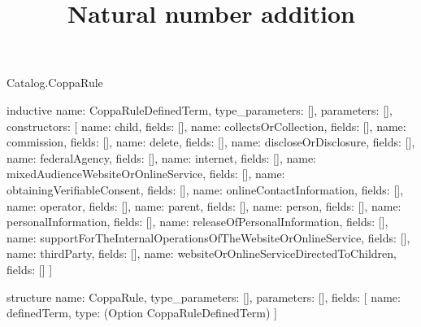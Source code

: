 \begin{lexlean}{Catalog.CoppaRule}
\title{Natural number addition}
\begin{semanticmodule}
inductive{
  name: CoppaRuleDefinedTerm,
  type_parameters: [],
  parameters: [],
  constructors: [
    {name: child, fields: []},
    {name: collectsOrCollection, fields: []},
    {name: commission, fields: []},
    {name: delete, fields: []},
    {name: discloseOrDisclosure, fields: []},
    {name: federalAgency, fields: []},
    {name: internet, fields: []},
    {name: mixedAudienceWebsiteOrOnlineService, fields: []},
    {name: obtainingVerifiableConsent, fields: []},
    {name: onlineContactInformation, fields: []},
    {name: operator, fields: []},
    {name: parent, fields: []},
    {name: person, fields: []},
    {name: personalInformation, fields: []},
    {name: releaseOfPersonalInformation, fields: []},
    {name: supportForTheInternalOperationsOfTheWebsiteOrOnlineService, fields: []},
    {name: thirdParty, fields: []},
    {name: websiteOrOnlineServiceDirectedToChildren, fields: []}
  ]
}

structure{
  name: CoppaRule,
  type_parameters: [],
  parameters: [],
  fields: [
    {name: definedTerm, type: (Option CoppaRuleDefinedTerm)}
  ]
}
\end{semanticmodule}
\end{lexlean}
